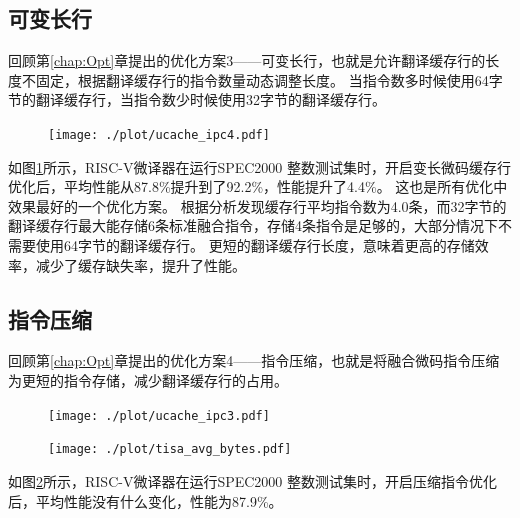 \subsection{可变长行}

回顾第\ref{chap:Opt}章提出的优化方案3——可变长行，也就是允许翻译缓存行的长度不固定，根据翻译缓存行的指令数量动态调整长度。
当指令数多时候使用64字节的翻译缓存行，当指令数少时候使用32字节的翻译缓存行。

\begin{figure}[!htbp]
  \centering
  \texttt{[image: ./plot/ucache\_ipc4.pdf]}
  \label{img:ipc4}
\end{figure}


如图\ref{img:ipc4}所示，RISC-V微译器在运行SPEC2000 整数测试集时，开启变长微码缓存行优化后，平均性能从87.8\%提升到了92.2\%，性能提升了4.4\%。
这也是所有优化中效果最好的一个优化方案。
根据分析发现缓存行平均指令数为4.0条，而32字节的翻译缓存行最大能存储6条标准融合指令，存储4条指令是足够的，大部分情况下不需要使用64字节的翻译缓存行。
更短的翻译缓存行长度，意味着更高的存储效率，减少了缓存缺失率，提升了性能。

\subsection{指令压缩}

回顾第\ref{chap:Opt}章提出的优化方案4——指令压缩，也就是将融合微码指令压缩为更短的指令存储，减少翻译缓存行的占用。

\begin{figure}[!htbp]
  \centering
  \texttt{[image: ./plot/ucache\_ipc3.pdf]}
  \label{img:ipc3}
\end{figure}

\begin{figure}[!htbp]
  \centering
  \texttt{[image: ./plot/tisa\_avg\_bytes.pdf]}
  \label{img:avg_bytes}
\end{figure}


如图\ref{img:ipc3}所示，RISC-V微译器在运行SPEC2000 整数测试集时，开启压缩指令优化后，平均性能没有什么变化，性能为87.9\%。


